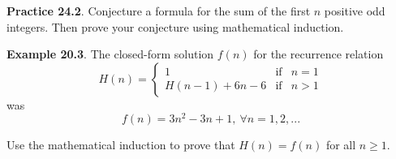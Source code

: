 \documentclass[aspectratio=169]{beamer}
\begin{document}
\begin{frame}[plain]{}

   {\bf Practice 24.2}. Conjecture a formula for the sum of the first $n$
  positive odd integers. Then prove your conjecture using
   mathematical induction.
    \vspace{1.7in}
    

\end{frame}


\begin{frame}[plain]{}

{\bf Example 20.3}. The closed-form solution $f(n)$ for the recurrence relation 
    \[ H(n) = \left\{ \begin{array}{ccc}
                       1 &\mbox{if}& n = 1\\
                       H(n-1)+6n-6 &\mbox{if}& n>1
                      \end{array} \right. 
    \]
 was 
  \[ f(n) = 3n^2-3n+1, \ \forall n = 1, 2, ...
  \]
  
  Use the mathematical induction to prove that $H(n) = f(n)$ for all $n\geq 1$.
  
  \vspace{1in}
   
 
\end{frame}
\end{document}
